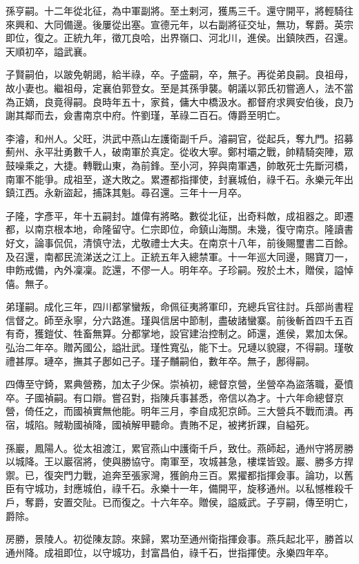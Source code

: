 \begin{pinyinscope}
孫亨嗣。十二年從北征，為中軍副將。至土剌河，獲馬三千。還守開平，將輕騎往來興和、大同備邊。後屢從出塞。宣德元年，以右副將征交址，無功，奪爵。英宗即位，復之。正統九年，徵兀良哈，出界嶺口、河北川，進侯。出鎮陜西，召還。天順初卒，謚武襄。

子賢嗣伯，以跛免朝謁，給半祿，卒。子盛嗣，卒，無子。再從弟良嗣。良祖母，故小妻也。繼祖母，定襄伯郭登女。至是其孫爭襲。朝議以郭氏初嘗適人，法不當為正嫡，良竟得嗣。良時年五十，家貧，傭大中橋汲水。都督府求興安伯後，良乃謝其鄰而去，僉書南京中府。忤劉瑾，革祿二百石。傳爵至明亡。

李濬，和州人。父旺，洪武中燕山左護衛副千戶。濬嗣官，從起兵，奪九門。招募薊州、永平壯勇數千人，破南軍於真定。從收大寧。鄭村壩之戰，帥精騎突陣，眾鼓噪乘之，大捷。轉戰山東，為前鋒。至小河，猝與南軍遇，帥敢死士先斷河橋，南軍不能爭。成祖至，遂大敗之。累遷都指揮使，封襄城伯，祿千石。永樂元年出鎮江西。永新盜起，捕誅其魁。尋召還。三年十一月卒。

子隆，字彥平，年十五嗣封。雄偉有將略。數從北征，出奇料敵，成祖器之。即遷都，以南京根本地，命隆留守。仁宗即位，命鎮山海關。未幾，復守南京。隆讀書好文，論事侃侃，清慎守法，尤敬禮士大夫。在南京十八年，前後賜璽書二百餘。及召還，南都民流涕送之江上。正統五年入總禁軍。十一年巡大同邊，賜寶刀一，申飭戒備，內外凜凜。訖還，不僇一人。明年卒。子珍嗣。歿於土木，贈侯，謚悼僖。無子。

弟瑾嗣。成化三年，四川都掌蠻叛，命佩征夷將軍印，充總兵官往討。兵部尚書程信督之。師至永寧，分六路進。瑾與信居中節制，盡破諸蠻寨。前後斬首四千五百有奇，獲鎧仗、牲畜無算。分都掌地，設官建治控制之。師還，進侯，累加太保。弘治二年卒。贈芮國公，謚壯武。瑾性寬弘，能下士。兄璉以貌寢，不得嗣。瑾敬禮甚厚。璉卒，撫其子鄌如己子。瑾子黼嗣伯，數年卒。無子，鄌得嗣。

四傳至守錡，累典營務，加太子少保。崇禎初，總督京營，坐營卒為盜落職，憂憤卒。子國禎嗣。有口辯。嘗召對，指陳兵事甚悉，帝信以為才。十六年命總督京營，倚任之，而國禎實無他能。明年三月，李自成犯京師。三大營兵不戰而潰。再宿，城陷。賊勒國禎降，國禎解甲聽命。責賄不足，被拷折踝，自縊死。

孫巖，鳳陽人。從太祖渡江，累官燕山中護衛千戶，致仕。燕師起，通州守將房勝以城降。王以巖宿將，使與勝協守。南軍至，攻城甚急，樓堞皆毀。巖、勝多方捍禦。已，復突門力戰，追奔至張家灣，獲餉舟三百。累擢都指揮僉事。論功，以舊臣有守城功，封應城伯，祿千石。永樂十一年，備開平，旋移通州。以私憾椎殺千戶，奪爵，安置交阯。已而復之。十六年卒。贈侯，謚威武。子亨嗣，傳至明亡，爵除。

房勝，景陵人。初從陳友諒。來歸，累功至通州衛指揮僉事。燕兵起北平，勝首以通州降。成祖即位，以守城功，封富昌伯，祿千石，世指揮使。永樂四年卒。


\end{pinyinscope}
